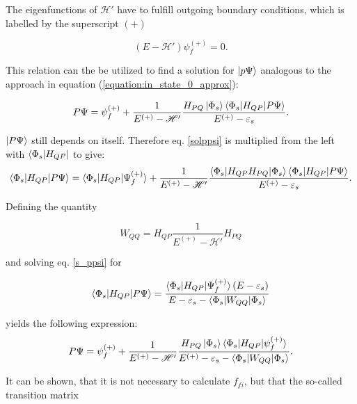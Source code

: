 The eigenfunctions of $\mathscr{H}'$ have to fulfill outgoing boundary conditions,
which is labelled by the superscript $(+)$

\begin{equation}
  (E-\mathscr{H}') \psi_f^{(+)} = 0 \label{sol_outg} .
\end{equation}

This relation can the be utilized to find a solution for $\ket{p \Psi}$ analogous
to the approach in equation (\ref{equation:in_state_0_approx}):

\begin{equation}\label{sol_ppsi}
  P \Psi = \psi_f^{(+)} + \frac{1}{E^{(+)} - \mathscr{H}'}
           \frac{H_{PQ}\ket{\Phi_s}
           \braket{\Phi_s|H_{QP}|P\Psi}}{E^{(+)} - \varepsilon_s} .
\end{equation}

$\ket{P \Psi}$ still depends on itself. Therefore 
eq. \ref{solppsi}
is multiplied from the left with $\bra{\Phi_s|H_{QP}}$ to give:
\begin{equation}
  \braket{\Phi_s|H_{QP}|P\Psi} = \braket{\Phi_s|H_{QP}|\Psi_f^{(+)}} +
  \frac{1}{E^{(+)} - \mathscr{H}'}
  \frac{\braket{\Phi_s|H_{QP}H_{PQ}|\Phi_s} \braket{\Phi_s|H_{QP}|P\Psi}}
       {E^{(+)} - \varepsilon_s}  \label{s_ppsi} .
\end {equation}

Defining the quantity

\begin{equation}
  W_{QQ} = H_{QP}\frac{1}{E^{(+)} - \mathscr{H}'}H_{PQ}
\end{equation}

and solving eq. \ref{s_ppsi} for

\begin{equation}
  \braket{\Phi_s|H_{QP}|P\Psi} = \frac{\braket{\Phi_s|H_{QP}|\Psi_f^{(+)}}(E-\varepsilon_s)}
{E - \varepsilon_s - \braket{\Phi_s|W_{QQ}|\Phi_s}}
\end{equation}

yields the following expression:
\begin{equation}\label{}
  P \Psi = \psi_f^{(+)} + \frac{1}{E^{(+)} - \mathscr{H}'}
           \frac{H_{PQ}\ket{\Phi_s}
           \braket{\Phi_s|H_{QP}|\psi_f^{(+)}}}
           {E^{(+)} - \varepsilon_s - \braket{\Phi_s|W_{QQ}|\Phi_s}} .
\end{equation}

It can be shown, that it is not necessary to calculate $f_{fi}$, but that the
so-called transition matrix


